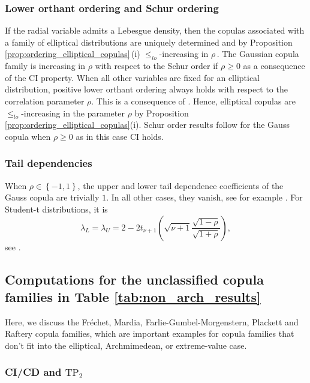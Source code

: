 \documentclass{article}
\def\of#1{\left(#1\right)} %
\def\setof#1{\left\{#1\right\}} %
\newcommand{\TP}{\mathrm{TP_2}}
\begin{document}
\subsubsection{Lower orthant ordering and Schur ordering}
\label{subsubsec:elliptical_lo_ordering}

If the radial variable admits a Lebesgue density, then the copulas associated with a family of elliptical distributions are uniquely determined and by Proposition \ref{prop:ordering_elliptical_copulas}\,(i) \(\leq_{lo}\)-increasing in \(\rho\,.\)
The Gaussian copula family is increasing in \(\rho\) with respect to the Schur order if \(\rho\geq 0\) as a consequence of the CI property.
When all other variables are fixed for an elliptical distribution, positive lower orthant ordering always holds with respect to the correlation parameter $\rho$.
This is a consequence of \cite[Theorem 5.1]{gupta1971inequalities}.
Hence, elliptical copulas are \(\leq_{lo}\)-increasing in the parameter $\rho$ by Proposition \ref{prop:ordering_elliptical_copulas}(i).
Schur order results follow for the Gauss copula when $\rho\geq 0$ as in this case CI holds.

\subsubsection{Tail dependencies}
\label{subsubsec:elliptical_tail_dependencies}
When $\rho\in\setof{-1, 1}$, the upper and lower tail dependence coefficients of the Gauss copula are trivially $1$.
In all other cases, they vanish, see for example \cite[Corollary 1]{furman2016tail}.
For Student-t distributions, it is 
\[
    \lambda_L
    = \lambda_U
    = 2-2 t_{\nu+1}\of{\sqrt{\nu+1} \frac{\sqrt{1-\rho}}{\sqrt{1+\rho}}}
,\]
see \cite[Section 5.3]{embrechts2001modelling}.

\subsection{Computations for the unclassified copula families in Table \ref{tab:non_arch_results}}
\label{subsec:unclassified_copula_families}

Here, we discuss the Fréchet, Mardia, Farlie-Gumbel-Morgenstern, Plackett and Raftery copula families, which are important examples for copula families that don't fit into the elliptical, Archmimedean, or extreme-value case.

\subsubsection{CI/CD and $\TP$}\label{subsubsec:unclassified_ci_and_TP2}
\end{document}
